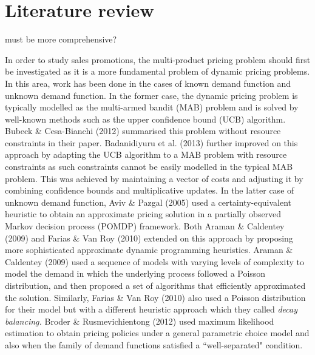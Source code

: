 \documentclass[a4paper]{article}
\begin{document}
\section{Literature review}
must be more comprehensive? 

In order to study sales promotions, the multi-product pricing problem should first be investigated as it is a more fundamental problem of dynamic pricing problems. In this area, work has been done in the cases of known demand function and unknown demand function. In the former case, the dynamic pricing problem is typically modelled as the multi-armed bandit (MAB) problem and is solved by well-known methods such as the upper confidence bound (UCB) algorithm. Bubeck \& Cesa-Bianchi (2012) summarised this problem without resource constraints in their paper. Badanidiyuru et al. (2013) further improved on this approach by adapting the UCB algorithm to a MAB problem with resource constraints as such constraints cannot be easily modelled in the typical MAB problem. This was achieved by maintaining a vector of costs and adjusting it by combining confidence bounds and multiplicative updates. 
\newline
\newline
In the latter case of unknown demand function, Aviv \& Pazgal (2005) used a certainty-equivalent heuristic to obtain an approximate pricing solution in a partially observed Markov decision process (POMDP) framework. Both Araman \& Caldentey (2009) and Farias \& Van Roy (2010) extended on this approach by proposing more sophisticated approximate dynamic programming heuristics. Araman \& Caldentey (2009) used a sequence of models with varying levels of complexity to model the demand in which the underlying process followed a Poisson distribution, and then proposed a set of algorithms that efficiently approximated the solution. Similarly, Farias \& Van Roy (2010) also used a Poisson distribution for their model but with a different heuristic approach which they called \textit{decay balancing.} Broder \& Rusmevichientong (2012) used maximum likelihood estimation to obtain pricing policies under a general parametric choice model and also when the family of demand functions satisfied a ``well-separated" condition. 

\end{document}
